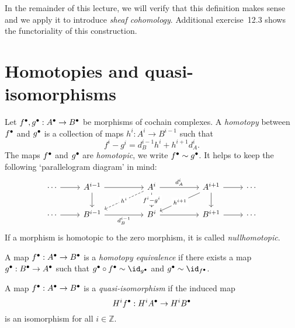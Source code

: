 In the remainder of this lecture, we will verify that this definition makes sense and we apply it to introduce \emph{sheaf cohomology}.
Additional exercise~12.3 shows the functoriality of this construction.

\section{Homotopies and quasi-isomorphisms}
\begin{defn}
Let ${f}^\bullet, {g}^\bullet: {A}^\bullet \to {B}^\bullet$ be morphisms of cochain complexes. A \emph{homotopy} between ${f}^\bullet$ and ${g}^\bullet$ is a collection of maps $h^i: A^i \to B^{i-1}$ such that \[
	f^i - g^i = d^{i-1}_B h^i + h^{i+1}d^i_A.
\]
The maps ${f}^\bullet$ and ${g}^\bullet$ are \emph{homotopic}, we write ${f}^\bullet \sim {g}^\bullet$. It helps to keep the following `parallelogram diagram' in mind: 
\[\begin{tikzcd}
	{\cdots } & {A^{i-1}} && {A^i} && {A^{i+1}} & \cdots \\
	\cdots & {B^{i-1}} && {B^{i}} && {B^{i+1}} & \cdots
	\arrow[from=1-1, to=1-2]
	\arrow[from=1-2, to=1-4]
	\arrow[from=1-2, to=2-2]
	\arrow["{d^i_A}", from=1-4, to=1-6]
	\arrow["{h^i}"{description}, dashed, from=1-4, to=2-2]
	\arrow["{f^i - g^i}"{description}, from=1-4, to=2-4]
	\arrow[from=1-6, to=1-7]
	\arrow["{h^{i+1}}"{description}, from=1-6, to=2-4]
	\arrow[from=1-6, to=2-6]
	\arrow[from=2-1, to=2-2]
	\arrow["{d^{i-1}_B}"', from=2-2, to=2-4]
	\arrow[from=2-4, to=2-6]
	\arrow[from=2-6, to=2-7]
\end{tikzcd}\]
If a morphism is homotopic to the zero morphism, it is called \emph{nullhomotopic}.
\end{defn}

\begin{defn}
	A map ${f}^\bullet: {A}^\bullet \to {B}^\bullet$ is a \emph{homotopy equivalence} if there exists a map ${g}^\bullet: {B}^\bullet \to {A}^\bullet$ such that $\cochaincomplex{g} \circ \cochaincomplex{f} \sim \id_{\cochaincomplex{g}}$ and $\cochaincomplex{g} \sim \id_{\cochaincomplex{f}}$. 
\end{defn}

\begin{defn}
	A map ${f}^\bullet: {A}^\bullet \to {B}^\bullet$ is a \emph{quasi-isomorphism} if the induced map \[
    	\cohomology^i{\cochaincomplex{f}}: \cohomology^i{\cochaincomplex{A}} \to \cohomology^i{\cochaincomplex{B}}
    \] is an isomorphism for all $i \in \mathbb{Z}$. 
\end{defn}


